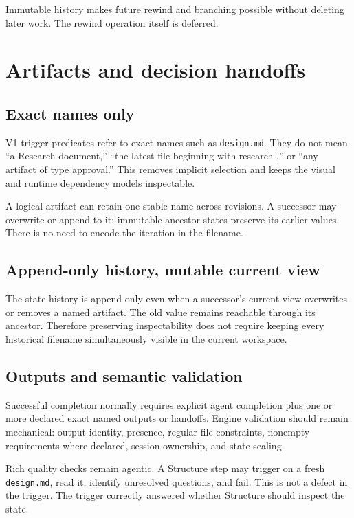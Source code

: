 \documentclass[11pt]{article}
\newcommand{\artifact}[1]{\texttt{#1}}
\begin{document}
Immutable history makes future rewind and branching possible without deleting later work. The rewind operation itself is deferred.

\section{Artifacts and decision handoffs}

\subsection{Exact names only}

V1 trigger predicates refer to exact names such as \artifact{design.md}. They do not mean ``a Research document,'' ``the latest file beginning with research-,'' or ``any artifact of type approval.'' This removes implicit selection and keeps the visual and runtime dependency models inspectable.

A logical artifact can retain one stable name across revisions. A successor may overwrite or append to it; immutable ancestor states preserve its earlier values. There is no need to encode the iteration in the filename.

\subsection{Append-only history, mutable current view}

The state history is append-only even when a successor's current view overwrites or removes a named artifact. The old value remains reachable through its ancestor. Therefore preserving inspectability does not require keeping every historical filename simultaneously visible in the current workspace.

\subsection{Outputs and semantic validation}

Successful completion normally requires explicit agent completion plus one or more declared exact named outputs or handoffs. Engine validation should remain mechanical: output identity, presence, regular-file constraints, nonempty requirements where declared, session ownership, and state sealing.

Rich quality checks remain agentic. A Structure step may trigger on a fresh \artifact{design.md}, read it, identify unresolved questions, and fail. This is not a defect in the trigger. The trigger correctly answered whether Structure should inspect the state.
\end{document}
